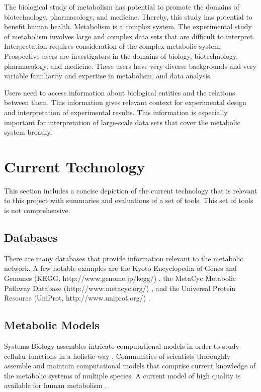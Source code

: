 The biological study of metabolism has potential to promote the domains of biotechnology, pharmacology, and medicine.
Thereby, this study has potential to benefit human health.
Metabolism is a complex system.
The experimental study of metabolism involves large and complex data sets that are difficult to interpret.
Interpretation requires consideration of the complex metabolic system.
Prospective users are investigators in the domains of biology, biotechnology, pharmacology, and medicine.
These users have very diverse backgrounds and very variable familiarity and expertise in metabolism, and data analysis.

Users need to access information about biological entities and the relations between them.
This information gives relevant context for experimental design and interpretation of experimental results.
This information is especially important for interpretation of large-scale data sets that cover the metabolic system broadly.

\section{Current Technology}

This section includes a concise depiction of the current technology that is relevant to this project with summaries and evaluations of a set of tools.
This set of tools is not comprehensive.

\subsection{Databases}

There are many databases that provide information relevant to the metabolic network.
A few notable examples are the Kyoto Encyclopedia of Genes and Genomes (KEGG, http://www.genome.jp/kegg/) \supercite{kanehisa_kegg_2016}, the MetaCyc Metabolic Pathway Database (http://www.metacyc.org/) \supercite{caspi_metacyc_2016}, and the Universal Protein Resource (UniProt, http://www.uniprot.org/) \supercite{uniprot_consortium_uniprot:_2015}.

\subsection{Metabolic Models}

Systems Biology assembles intricate computational models in order to study cellular functions in a holistic way \supercite{obrien_using_2015, bordbar_constraint-based_2014}.
Communities of scientists thoroughly assemble and maintain computational models that comprise current knowledge of the metabolic systems of multiple species.
A current model of high quality is available for human metabolism \supercite{thiele_community-driven_2013, swainston_recon_2016}.

